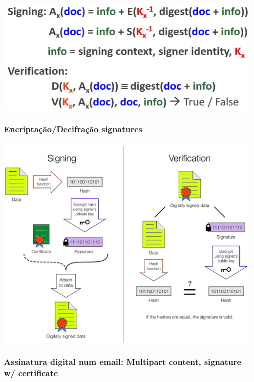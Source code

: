 \documentclass{article}
\begin{document}
\begin{center}
  \includegraphics[scale=0.4]{11}
\end{center}

\subsubsection{Encriptação/Decifração signatures}

\begin{center}
  \includegraphics[scale=0.5]{12}
\end{center}

\pagebreak

\subsubsection{Assinatura digital num email: Multipart content, signature w/ certificate}
\end{document}
